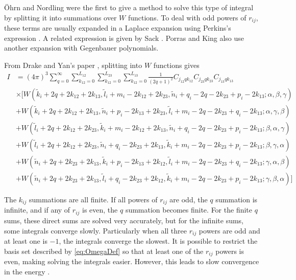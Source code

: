\documentclass[Dissertation.tex]{subfiles}
\begin{document}
{\"O}hrn and Nordling \cite{Ohrn1963} were the first to give a method to solve this type of integral by splitting it into summations over $W$ functions. To deal with odd powers of $r_{ij}$, these terms are usually expanded in a Laplace expansion using Perkins's expression \cite{Perkins1968}. A related expression is given by Sack \cite{Sack1964}. Porras and King \cite{Porras1994} also use another expansion with Gegenbauer polynomials.

From Drake and Yan's paper \cite{Drake1995}, splitting into $W$ functions gives
\begin{align}
\label{eq:FourBodyExpansion}
I &= (4\pi)^3 \sum_{q=0}^\infty \sum_{k_{12} = 0}^{L_{12}} \sum_{k_{12} = 0}^{L_{23}} \sum_{k_{12} = 0}^{L_{13}} \frac{1}{(2q+1)^2} C_{j_{12} q k_{12}} C_{j_{23} q k_{23}} C_{j_{13} q k_{13}} \nonumber \\
& \times [W(\tilde{k}_i + 2q + 2 k_{12} + 2 k_{13}, \tilde{l}_i + m_i - 2 k_{12} + 2 k_{23}, \tilde{n}_i + q_i - 2 q - 2 k_{23} + p_i - 2 k_{13}; \alpha, \beta, \gamma) \nonumber \\
      & + W(\tilde{k}_i + 2q + 2 k_{12} + 2 k_{13}, \tilde{n}_i + p_i - 2 k_{13} + 2 k_{23}, \tilde{l}_i + m_i - 2 q - 2 k_{23} + q_i - 2 k_{13}; \alpha, \gamma, \beta) \nonumber \\
      & + W(\tilde{l}_i + 2q + 2 k_{12} + 2 k_{23}, \tilde{k}_i + m_i - 2 k_{12} + 2 k_{13}, \tilde{n}_i + q_i - 2 q - 2 k_{23} + p_i - 2 k_{13}; \beta, \alpha, \gamma) \nonumber \\
      & + W(\tilde{l}_i + 2q + 2 k_{12} + 2 k_{23}, \tilde{n}_i + q_i - 2 k_{23} + 2 k_{13}, \tilde{k}_i + m_i - 2 q - 2 k_{23} + p_i - 2 k_{13}; \beta, \gamma, \alpha) \nonumber \\
      & + W(\tilde{n}_i + 2q + 2 k_{23} + 2 k_{13}, \tilde{k}_i + p_i - 2 k_{13} + 2 k_{12}, \tilde{l}_i + m_i - 2 q - 2 k_{23} + q_i - 2 k_{13}; \gamma, \alpha, \beta) \nonumber \\
      & + W(\tilde{n}_i + 2q + 2 k_{23} + 2 k_{13}, \tilde{l}_i + q_i - 2 k_{23} + 2 k_{12}, \tilde{k}_i + m_i - 2 q - 2 k_{23} + p_i - 2 k_{13}; \gamma, \beta, \alpha)]
\end{align}

The $k_{ij}$ summations are all finite. If all powers of $r_{ij}$ are odd, the $q$ summation is infinite, and if any of $r_{ij}$ is even, the $q$ summation becomes finite. For the finite $q$ sums, these direct sums are solved very accurately, but for the infinite sums, some integrals converge slowly. Particularly when all three $r_{ij}$ powers are odd and at least one is $-1$, the integrals converge the slowest. It is possible to restrict the basis set described by \cref{eq:OmegaDef} so that at least one of the $r_{ij}$ powers is even, making solving the integrals easier. However, this leads to slow convergence in the energy \cite{Drake1995}.
\end{document}
